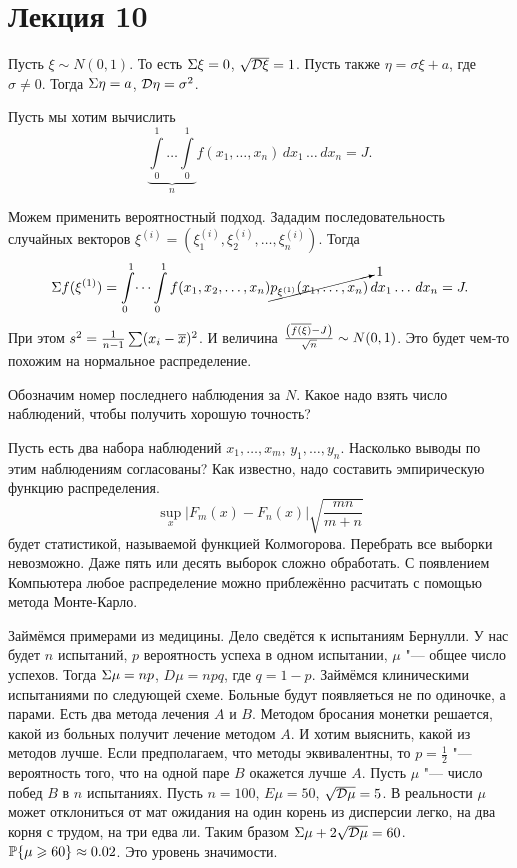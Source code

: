 \section{Лекция 10}
Пусть $\xi\sim N(0,1)$. То есть $\E\xi=0$, $\sqrt{\D\xi} = 1$. Пусть также $\eta = \sigma\xi + a$, где $\sigma\ne0$. Тогда $\E\eta = a$, $\D\eta = \sigma^2$.

Пусть мы хотим вычислить
\[
  \underbrace{\int\limits_0^1\ldots\int\limits_0^1}_n f(x_1,\dots,x_n)\,dx_1\,\dots\,dx_n = J.
\]

Можем применить вероятностный подход.
Зададим последовательность случайных векторов $\xi^{(i)} = \left( \xi_1^{(i)},\xi_2^{(i)},\ldots,\xi_n^{(i)} \right)$. Тогда
\[
  \E f(\xi^{(1)}) = \int\limits_0^1\dots\int\limits_0^1 f(x_1,x_2,\dots,x_n) \cancelto1{p_{\xi^{(1)}}(x_1,\dots,x_n)}\,dx_1\dots\,dx_n = J.
\]
При этом $s^2 = \frac1{n-1} \sum (x_i-\ol x)^2$. И величина $\frac{\left( \ol{f(\xi)} - J \right)}{\sqrt n}\sim N(0,1)$. Это будет чем-то похожим на нормальное распределение.

Обозначим номер последнего наблюдения за $N$. Какое надо взять число наблюдений, чтобы получить хорошую точность?

Пусть есть два набора наблюдений $x_1,\dots,x_m$, $y_1,\dots,y_n$. Насколько выводы по этим наблюдениям согласованы? Как известно, надо составить эмпирическую функцию распределения.
\[
  \sup\limits_x \big|F_m(x) - F_n(x)\big|\sqrt{\frac{mn}{m+n}}
\]
будет статистикой, называемой функцией Колмогорова. Перебрать все выборки невозможно. Даже пять или десять выборок сложно обработать. С появлением Компьютера любое распределение можно приблежённо расчитать с помощью метода Монте-Карло.

Займёмся примерами из медицины. Дело сведётся к испытаниям Бернулли. У нас будет $n$ испытаний, $p$ вероятность успеха в одном испытании, $\mu$ "--- общее число успехов. Тогда $\E\mu=np$, $D\mu = npq$, где $q=1-p$. Займёмся клиническими испытаниями по следующей схеме. Больные будут появляеться не по одиночке, а парами. Есть два метода лечения $A$ и $B$. Методом бросания монетки решается, какой из больных получит лечение методом $A$. И хотим выяснить, какой из методов лучше. Если предполагаем, что методы эквивалентны, то $p=\frac12$ "--- вероятность того, что на одной паре $B$ окажется лучше $A$. Пусть $\mu$ "--- число побед $B$ в $n$ испытаниях. Пусть $n=100$, $E\mu = 50$, $\sqrt{\D\mu} = 5$. В реальности $\mu$ может отклониться от мат ожидания на один корень из дисперсии легко, на два корня с трудом, на три едва ли. Таким бразом $\E\mu + 2 \sqrt{\D\mu} = 60$. $\P\{\mu\ge60\} \approx 0.02$. Это уровень значимости.

